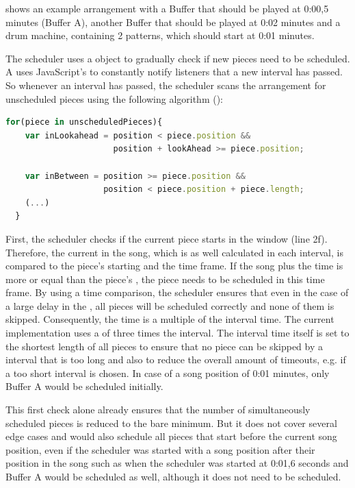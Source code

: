  shows an example arrangement with a Buffer that should be played at 0:00,5 minutes (Buffer A), another Buffer that should be played at 0:02 minutes and a drum machine, containing 2 patterns, which should start at 0:01 minutes.

The scheduler uses a  object to gradually check if new pieces need to be scheduled. A  uses JavaScript's  to constantly notify listeners that a new interval has passed. So whenever an interval has passed, the scheduler scans the arrangement for unscheduled pieces using the following algorithm ():

\begin{lstlisting}[language=JavaScript, caption=Detecting pieces that need to be scheduled, label=lst:scheduling-pieces-p1]
  for(piece in unscheduledPieces){
    var inLookahead = position < piece.position &&
                      position + lookAhead >= piece.position;

    var inBetween = position >= piece.position &&
                    position < piece.position + piece.length;
    (...)
  }
\end{lstlisting}

First, the scheduler checks if the current piece starts in the  window (line 2f). Therefore, the current  in the song, which is as well calculated in each interval, is compared to the piece's starting  and the  time frame. If the song  plus the  time is more or equal than the piece's , the piece needs to be scheduled in this time frame. By using a  time comparison, the scheduler ensures that even in the case of a large delay in the  , all pieces will be scheduled correctly and none of them is skipped. Consequently, the  time is a multiple of the  interval time. The current implementation uses a  of three times the interval. The interval time itself is set to the shortest length of all pieces to ensure that no piece can be skipped by a interval that is too long and also to reduce the overall amount of timeouts, e.g. if a too short interval is chosen. In case of a song position of 0:01 minutes, only Buffer A would be scheduled initially.

This first check alone already ensures that the number of simultaneously scheduled pieces is reduced to the bare minimum. But it does not cover several edge cases and would also schedule all pieces that start before the current song position, even if the scheduler was started with a song position after their position in the song such as when the scheduler was started at 0:01,6 seconds and Buffer A would be scheduled as well, although it does not need to be scheduled.

